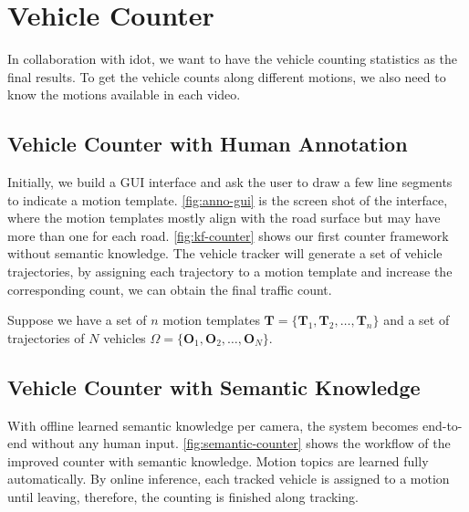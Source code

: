 \section{Vehicle Counter}
\label{sec:system-counter}

In collaboration with \gls{idot}, we want to have the vehicle counting statistics as the final results. To get the  vehicle counts along different motions, we also need to know the motions available in each video. 

\subsection{Vehicle Counter with Human Annotation}
Initially, we build a GUI interface and ask the user to draw a few line segments to indicate a motion template. \ref{fig:anno-gui} is the screen shot of the interface, where the motion templates mostly align with the road surface but may have more than one for each road. 
\ref{fig:kf-counter} shows our first counter framework without semantic knowledge. The vehicle tracker will generate a set of vehicle trajectories, by assigning each trajectory to a motion template and increase the corresponding count, we can obtain the final traffic count. 

Suppose we have a set of $n$ motion templates $\mathbf{T} = \{\mathbf{T}_1, \mathbf{T}_2, \dots, \mathbf{T}_n\}$ and a set of trajectories of $N$ vehicles $\Omega= \{\mathbf{O}_1, \mathbf{O}_2, \dots, \mathbf{O}_N\}$.




\subsection{Vehicle Counter with Semantic Knowledge}
With offline learned semantic knowledge per camera, the system becomes end-to-end without any human input. 
\ref{fig:semantic-counter} shows the workflow of the improved counter with semantic knowledge. 
Motion topics are learned fully automatically.
By online inference, each tracked vehicle is assigned to a motion until leaving, therefore, the counting is finished along tracking. 



